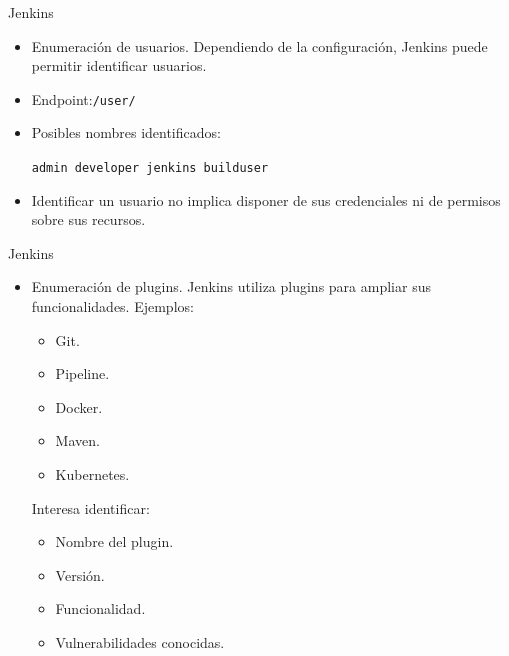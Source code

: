 \documentclass[aspectratio=169,11pt]{beamer}
\newcommand{\cmd}[1]{\texttt{#1}}
\begin{document}
\begin{frame}{Jenkins} 
  \small
     \begin{itemize} 
      \item Enumeración de usuarios. Dependiendo de la configuración, Jenkins puede permitir identificar usuarios. 
      \item Endpoint:\cmd{/user/} 
      \item Posibles nombres identificados: \begin{center}\cmd{admin developer jenkins builduser}\end{center} \vspace{0.3cm} 
      \item Identificar un usuario no implica disponer de sus credenciales ni de permisos sobre sus recursos. 
          \end{itemize} 
    \end{frame} 

\begin{frame}{Jenkins} 
    \small
     \begin{itemize} 
      \item Enumeración de plugins. Jenkins utiliza plugins para ampliar sus funcionalidades. \vspace{0.3cm} Ejemplos: \begin{itemize} \item Git. \item Pipeline. \item Docker. \item Maven. \item Kubernetes. \end{itemize} \vspace{0.3cm} Interesa identificar: \begin{itemize} \item Nombre del plugin. \item Versión. \item Funcionalidad. \item Vulnerabilidades conocidas.
       \end{itemize} 
                 \end{itemize} 

      \end{frame} 
\end{document}

